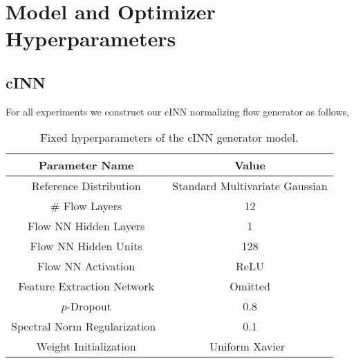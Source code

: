 \chapter{Model and Optimizer Hyperparameters}\label{ch:model-and-optimizer-hyperparameters}    %

\section{cINN}\label{sec:cinn}

For all experiments we construct our cINN normalizing flow generator as follows,

\begin{table}[htb]
    \caption[cINN Hyperparameters]{
        Fixed hyperparameters of the cINN generator model.
    }
    \begin{center}
        \begin{tabular}{|c|c|} \hline
        Parameter Name & Value  \\	%
        \hline \hline
        Reference Distribution                           & Standard Multivariate Gaussian    \\ \hline
        \# Flow Layers                                   & 12                                \\ \hline
        Flow NN Hidden Layers                            & 1                                 \\ \hline
        Flow NN Hidden Units                             & 128                               \\ \hline
        Flow NN Activation                               & ReLU                              \\ \hline
        Feature Extraction Network                       & Omitted\footnotemark              \\ \hline
        $p$-Dropout                                      & 0.8                               \\ \hline
        Spectral Norm Regularization~\cite{spectral_reg} & 0.1                               \\ \hline
        Weight Initialization                            & Uniform Xavier~\cite{xavier_init} \\ \hline
        \end{tabular}
        \\ \rule{0mm}{5mm}
    \end{center}
    \label{tab:generator_params}
\end{table}

